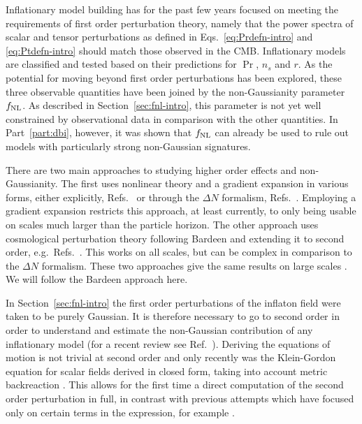 Inflationary model building has for the past few years focused on
meeting the requirements of first order perturbation theory, namely
that the power spectra of scalar and tensor perturbations as defined in
Eqs.~\eqref{eq:Prdefn-intro} and \eqref{eq:Ptdefn-intro} should match
those observed in the CMB.  Inflationary
models are classified and tested based on their predictions for $\Pr$, $n_s$ and
$r$. As the
potential for moving beyond first order perturbations has been
explored, these three observable quantities have been joined by the non-Gaussianity
parameter $f_{\mathrm{NL}}$. As described in Section~\ref{sec:fnl-intro}, this parameter is
not yet well constrained by observational data in comparison with the
other quantities. In Part~\ref{part:dbi}, however, it was shown that $f_{\mathrm{NL}}$ can
already be used to rule out models with particularly strong non-Gaussian signatures.


There are two main approaches to studying higher order effects and
non-Gaussianity.  
The first uses nonlinear theory and a gradient expansion in various
forms, either explicitly, \eg
Refs.~\cite{Salopek:1990jq,Rigopoulos:2005xx} or through the
$\Delta N$ formalism, \eg
Refs.~\cite{Starobinsky:1982ee,
Starobinsky:1986fxa, Sasaki:1995aw, Sasaki:1998ug,
Lyth:2004gb,Lyth:2005fi,Langlois:2006vv}.
Employing a gradient expansion restricts this approach, at least currently, to only
being usable on scales much larger than the particle horizon.  
The
other approach uses cosmological perturbation theory following Bardeen
\cite{Bardeen:1980kt} and extending it to second order,
e.g.~Refs.~\cite{Tomita:1967,Mukhanov:1996ak,Bruni:1996im,
  Acquaviva:2002ud,Nakamura:2003wk,Noh:2004bc,
  Bernardeau:2002jy,Maldacena:2002vr,
  Finelli:2003bp,Bartolo:2004if,Enqvist:2004bk,Lyth:2005du,Seery:2005gb,
  Malik:2003mv, Barnaby:2006cq}\footnotemark.
%
This works on all scales, but can be complex in comparison to the
$\Delta N$ formalism. These two approaches give the
same results on large scales \cite{Malik:2005cy}. We
will follow the Bardeen approach here.


In Section~\ref{sec:fnl-intro} the first order perturbations of the inflaton field
were taken to be purely Gaussian. It is therefore 
necessary to go to second order in order to understand and estimate
the non-Gaussian contribution of any inflationary model (for a recent
review see Ref.~\cite{Malik:2008im}). Deriving the equations of motion is
not trivial at second order and only recently was the Klein-Gordon
equation for scalar fields derived in closed form, taking into account
metric backreaction \cite{Malik:2006ir}. This allows for the first time
a direct computation of the second order perturbation in full, in
contrast with previous attempts which have focused only on certain
terms in the expression, for example .


